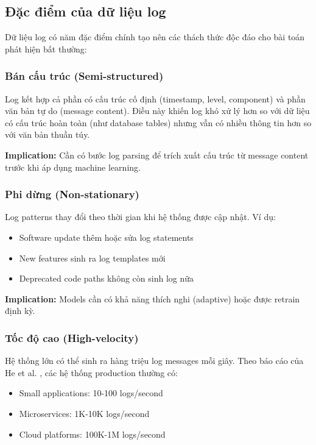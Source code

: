 \subsection{Đặc điểm của dữ liệu log}

Dữ liệu log có năm đặc điểm chính tạo nên các thách thức độc đáo cho bài toán phát hiện bất thường:

\subsubsection{Bán cấu trúc (Semi-structured)}

Log kết hợp cả phần có cấu trúc cố định (timestamp, level, component) và phần văn bản tự do (message content). Điều này khiến log khó xử lý hơn so với dữ liệu có cấu trúc hoàn toàn (như database tables) nhưng vẫn có nhiều thông tin hơn so với văn bản thuần túy.

\textbf{Implication:} Cần có bước log parsing để trích xuất cấu trúc từ message content trước khi áp dụng machine learning.

\subsubsection{Phi dừng (Non-stationary)}

Log patterns thay đổi theo thời gian khi hệ thống được cập nhật. Ví dụ:

\begin{itemize}
    \item Software update thêm hoặc sửa log statements
    \item New features sinh ra log templates mới
    \item Deprecated code paths không còn sinh log nữa
\end{itemize}

\textbf{Implication:} Models cần có khả năng thích nghi (adaptive) hoặc được retrain định kỳ.

\subsubsection{Tốc độ cao (High-velocity)}

Hệ thống lớn có thể sinh ra hàng triệu log messages mỗi giây. Theo báo cáo của He et al. \cite{he2020loganomaly}, các hệ thống production thường có:

\begin{itemize}
    \item Small applications: 10-100 logs/second
    \item Microservices: 1K-10K logs/second  
    \item Cloud platforms: 100K-1M logs/second
\end{itemize}

